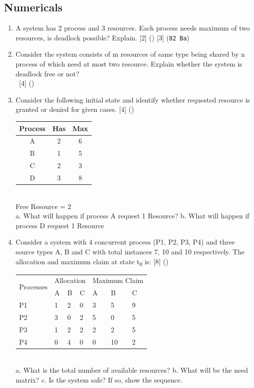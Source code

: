 \documentclass[12pt]{article}
\newcommand{\enter}{\\\textcolor{white}{1}}
\newcommand{\sub}[1]{\textsubscript{#1}}
\begin{document}
	\subsection{Numericals}
		\begin{enumerate}
			\item A system has 2 process and 3 resources. Each process needs maximum of two resources, is deadlock possible? Explain. \hfill [2] () [3] (\texttt{82 Ba})

			\item Consider the system consists of m resources of same type being shared by n process of which need at most two resource. Explain whether the system is deadlock free or not?
			\enter\hfill [4] ()

			\item Consider the following initial state and identify whether requested resource is granted or denied for given cases. \hfill [4] ()\\
			\begin{tabular}{|c|c|c|}
				\hline
				Process & Has & Max \\ \hline
				A & 2 & 6 \\ \hline
				B & 1 & 5 \\ \hline
				C & 2 & 3 \\ \hline
				D & 3 & 8 \\ \hline
			\end{tabular}\\
			Free Resource = 2\\
			a. What will happen if process A request 1 Resource?
			b. What will happen if process D request 1 Resource

			\item Consider a system with 4 concurrent process (P1, P2, P3, P4) and three source types A, B and C with total instances 7, 10 and 10 respectively. The allocation and maximum claim at state t\sub{0} is: \hfill [8] ()\\
			\begin{tabular}{|p{17mm}|p{7mm}|p{7mm}|p{7mm}|p{7mm}|p{7mm}|p{7mm}|}
				\hline
				\multirow{2}{*}{Processes} & \multicolumn{3}{|c|}{Allocation} & \multicolumn{3}{|c|}{Maximum Claim} \\ \cline{2-7}
				& A & B & C & A & B & C \\ \hline
				P1 & 1 & 2 & 0 & 3 & 5 & 9 \\ \hline
				P2 & 3 & 0 & 2 & 5 & 0 & 5 \\ \hline
				P3 & 1 & 2 & 2 & 2 & 2 & 5 \\ \hline
				P4 & 0 & 4 & 0 & 0 & 10 & 2 \\ \hline
			\end{tabular}\\
			a. What is the total number of available resources?
			b. What will be the need matrix?
			c. Is the system safe? If so, show the sequence.


\end{enumerate}
\end{document}
